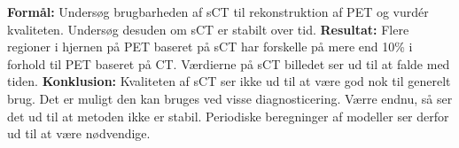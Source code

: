 \abstract

\textbf{Formål:} Undersøg brugbarheden af sCT til rekonstruktion af PET og vurdér kvaliteten. Undersøg desuden om sCT er stabilt over tid. \textbf{Resultat:} Flere regioner i hjernen på PET baseret på sCT har forskelle på mere end 10\% i forhold til PET baseret på CT. Værdierne på sCT billedet ser ud til at falde med tiden. \textbf{Konklusion:} Kvaliteten af sCT ser ikke ud til at være god nok til generelt brug. Det er muligt den kan bruges ved visse diagnosticering. Værre endnu, så ser det ud til at metoden ikke er stabil. Periodiske beregninger af modeller ser derfor ud til at være nødvendige.